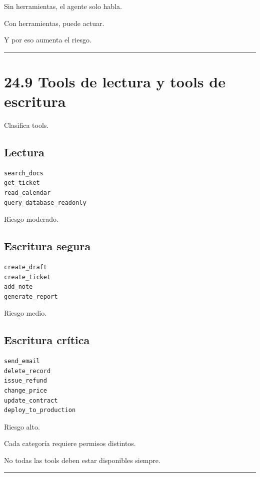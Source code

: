 Sin herramientas, el agente solo habla.

Con herramientas, puede actuar.

Y por eso aumenta el riesgo.

\begin{center}\rule{0.5\linewidth}{0.5pt}\end{center}

\section{24.9 Tools de lectura y tools de
escritura}\label{tools-de-lectura-y-tools-de-escritura}

Clasifica tools.

\subsection{Lectura}\label{lectura-1}

\begin{lstlisting}
search_docs
get_ticket
read_calendar
query_database_readonly
\end{lstlisting}

Riesgo moderado.

\subsection{Escritura segura}\label{escritura-segura-1}

\begin{lstlisting}
create_draft
create_ticket
add_note
generate_report
\end{lstlisting}

Riesgo medio.

\subsection{Escritura crítica}\label{escritura-cruxedtica-1}

\begin{lstlisting}
send_email
delete_record
issue_refund
change_price
update_contract
deploy_to_production
\end{lstlisting}

Riesgo alto.

Cada categoría requiere permisos distintos.

No todas las tools deben estar disponibles siempre.

\begin{center}\rule{0.5\linewidth}{0.5pt}\end{center}

